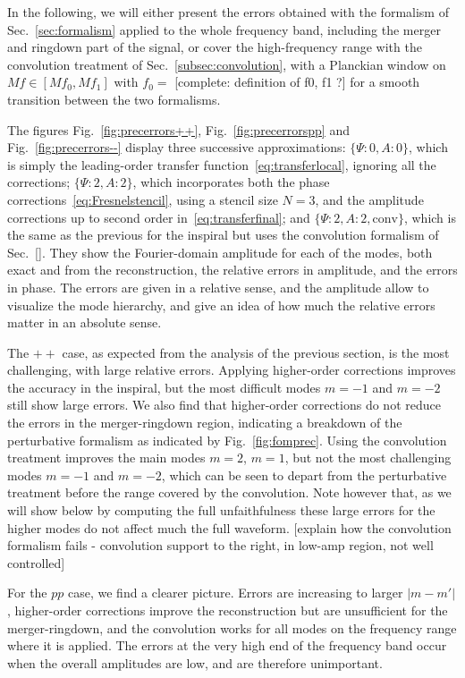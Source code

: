 \documentclass[aps,showpacs,twocolumn,
prd,superscriptaddress,nofootinbib]{revtex4-1}
\newcommand{\SM}[1]{{\color{Red} #1}}
\begin{document}
In the following, we will either present the errors obtained with the formalism of Sec.~\ref{sec:formalism} applied to the whole frequency band, including the merger and ringdown part of the signal, or cover the high-frequency range with the convolution treatment of Sec.~\ref{subsec:convolution}, with a Planckian window on $Mf\in [Mf_{0}, Mf_{1}]$ with $f_{0}=$ \SM{[complete: definition of f0, f1 ?]} for a smooth transition between the two formalisms.

The figures Fig.~\ref{fig:precerrors++}, Fig.~\ref{fig:precerrorspp} and Fig.~\ref{fig:precerrors--} display three successive approximations: $\{\Psi:0,A:0\}$, which is simply the leading-order transfer function~\eqref{eq:transferlocal}, ignoring all the corrections; $\{\Psi:2,A:2\}$, which incorporates both the phase corrections~\eqref{eq:Fresnelstencil}, using a stencil size $N=3$, and the amplitude corrections up to second order in~\eqref{eq:transferfinal}; and $\{\Psi:2,A:2,\text{conv}\}$, which is the same as the previous for the inspiral but uses the convolution formalism of Sec.~\ref{}. They show the Fourier-domain amplitude for each of the modes, both exact and from the reconstruction, the relative errors in amplitude, and the errors in phase. The errors are given in a relative sense, and the amplitude allow to visualize the mode hierarchy, and give an idea of how much the relative errors matter in an absolute sense.

The $++$ case, as expected from the analysis of the previous section, is the most challenging, with large relative errors. Applying higher-order corrections improves the accuracy in the inspiral, but the most difficult modes $m=-1$ and $m=-2$ still show large errors. We also find that higher-order corrections do not reduce the errors in the merger-ringdown region, indicating a breakdown of the perturbative formalism as indicated by Fig.~\ref{fig:fomprec}. Using the convolution treatment improves the main modes $m=2$, $m=1$, but not the most challenging modes $m=-1$ and $m=-2$, which can be seen to depart from the perturbative treatment before the range covered by the convolution. Note however that, as we will show below by computing the full unfaithfulness these large errors for the higher modes do not affect much the full waveform.
\SM{[explain how the convolution formalism fails - convolution support to the right, in low-amp region, not well controlled]}

For the $pp$ case, we find a clearer picture. Errors are increasing to larger $|m-m'|$, higher-order corrections improve the reconstruction but are unsufficient for the merger-ringdown, and the convolution works for all modes on the frequency range where it is applied. The errors at the very high end of the frequency band occur when the overall amplitudes are low, and are therefore unimportant. 
\end{document}
